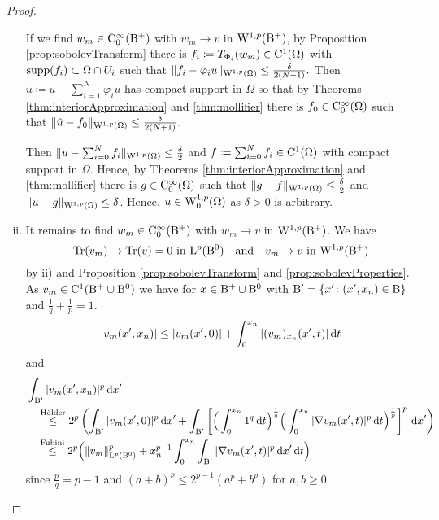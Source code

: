 \begin{proof}
\begin{enumerate}[i)]
    If we find $w_m \in \mathrm{C}_0^\infty(\mathrm{B}^+)$ with $w_m \to v$ in $\mathrm{W}^{1,p}(\mathrm{B}^+)$, by Proposition \ref{prop:sobolevTransform} there is $f_i \coloneqq T_{\Phi_i}(w_m) \in \mathrm{C}^1(\Omega)$ with $\operatorname{supp}(f_i) \subset \Omega \cap U_i$ such that 
    $\|f_i - \varphi_i u\|_{\mathrm{W}^{1,p}(\Omega)} \leq \frac{\delta}{2(N + 1)}.$
    Then $\tilde u \coloneqq u - \sum_{i = 1}^N \varphi_i u$ has compact support in $\Omega$ so that by Theorems \ref{thm:interiorApproximation} and \ref{thm:mollifier} there is $f_0 \in \mathrm{C}_0^\infty(\Omega)$ such that 
    $\| \tilde u - f_0 \|_{\mathrm{W}^{1,p}(\Omega)} \leq \frac{\delta}{2(N + 1)}.$

    Then $\| u - \sum_{i = 0}^N f_i \|_{\mathrm{W}^{1,p}(\Omega)} \leq \frac{\delta}{2}$ and $f \coloneqq \sum_{i = 0}^N f_i \in \mathrm{C}^1(\Omega)$ with compact support in $\Omega$.
    Hence, by Theorems \ref{thm:interiorApproximation} and \ref{thm:mollifier} there is $g \in \mathrm{C}_0^\infty(\Omega)$ such that $\|g - f\|_{\mathrm{W}^{1,p}(\Omega)} \leq \frac{\delta}{2}$ and $\|u - g\|_{\mathrm{W}^{1,p}(\Omega)} \leq \delta$.
    Hence, $u \in \mathrm{W}_0^{1,p}(\Omega)$ as $\delta > 0$ is arbitrary.

  \item It remains to find $w_m \in \mathrm{C}_0^\infty(\mathrm{B}^+)$ with $w_m \to v$ in $\mathrm{W}^{1,p}(\mathrm{B}^+)$.
    We have
    \begin{equation}
      \label{eq:traceAndSobolevConv}
      \operatorname{Tr}(v_m) \to \operatorname{Tr}(v) = 0 \text{ in } \mathrm{L}^p(\mathrm{B}^0) 
      \quad\text{and}\quad
      v_m \to v \text{ in } \mathrm{W}^{1,p}(\mathrm{B}^+)
    \end{equation}
    by ii) and Proposition \ref{prop:sobolevTransform} and \ref{prop:sobolevProperties}.
    As $v_m \in \mathrm{C}^1(\mathrm{B}^+ \cup \mathrm{B}^0)$ we have for $x \in \mathrm{B}^+ \cup \mathrm{B}^0$ with $\mathrm{B}' = \{x' \colon (x', x_n) \in \mathrm{B}\}$ and $\frac{1}{q} + \frac{1}{p} = 1$.
    $$
    |v_m(x', x_n)|
    \leq |v_m(x',0)| + \int_0^{x_n} |(v_m)_{x_n} (x', t)| \, {\operatorname{d}\!{t}}
    $$
    and
    \begin{align*}
      &\int_{\mathrm{B}'} |v_m(x', x_n)|^p \, {\operatorname{d}\!{x}}' \\
      &\quad\overset{\text{Hölder}}{\leq} 2^p \left( \int_{\mathrm{B}'} |v_m(x',0)|^p \, {\operatorname{d}\!{x}}' + \int_{\mathrm{B}'} \left[ \Big(\int_0^{x_n} 1^q \, {\operatorname{d}\!{t}}\Big)^{\frac{1}{q}} \Big( \int_0^{x_n} |\nabla v_m(x',t)|^p \, {\operatorname{d}\!{t}} \Big)^{\frac{1}{p}} \right]^p \, {\operatorname{d}\!{x}}' \right) \\
      &\quad\overset{\text{Fubini}}{\leq} 2^p \Big( \|v_m\|_{\mathrm{L}^p(\mathrm{B}^0)}^p + x_n^{p - 1} \int_0^{x_n} \int_{\mathrm{B}'} | \nabla v_m(x',t)|^p \, {\operatorname{d}\!{x}}' \, {\operatorname{d}\!{t}} \Big)
    \end{align*}
    since $\frac{p}{q} = p - 1$ and $(a + b)^p \leq 2^{p - 1}(a^p + b^p)$ for $a,b \geq 0$.


\end{enumerate}
\end{proof}
